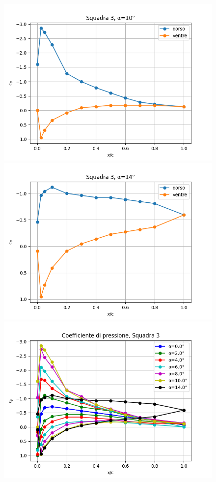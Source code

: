\begin{figure}[H]
    \includegraphics[width=.49\textwidth]{images/5/cp3 a=10.png}
    \includegraphics[width=.49\textwidth]{images/5/cp3 a=14.png}
    \includegraphics[width=.49\textwidth]{images/5/cp3.png}
\end{figure}
